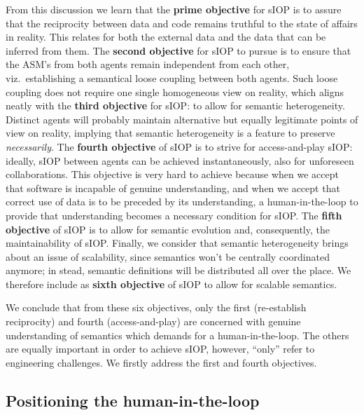 \documentclass[sort&compress,preprint,authoryear,3p,twocolumn]{elsarticle}
\begin{document}
From this discussion we learn that the \textbf{prime objective} for sIOP
is to assure that the reciprocity between data and code remains truthful
to the state of affairs in reality. This relates for both the external
data and the data that can be inferred from them. The \textbf{second
objective} for sIOP to pursue is to ensure that the ASM's from both
agents remain independent from each other, viz.~establishing a
semantical loose coupling between both agents. Such loose coupling does
not require one single homogeneous view on reality, which aligns neatly
with the \textbf{third objective} for sIOP: to allow for semantic
heterogeneity. Distinct agents will probably maintain alternative but
equally legitimate points of view on reality, implying that semantic
heterogeneity is a feature to preserve \emph{necessarily}. The
\textbf{fourth objective} of sIOP is to strive for access-and-play sIOP:
ideally, sIOP between agents can be achieved instantaneously, also for
unforeseen collaborations. This objective is very hard to achieve
because when we accept that software is incapable of genuine
understanding, and when we accept that correct use of data is to be
preceded by its understanding, a human-in-the-loop to provide that
understanding becomes a necessary condition for sIOP. The \textbf{fifth
objective} of sIOP is to allow for semantic evolution and, consequently,
the maintainability of sIOP. Finally, we consider that semantic
heterogeneity brings about an issue of scalability, since semantics
won't be centrally coordinated anymore; in stead, semantic definitions
will be distributed all over the place. We therefore include as
\textbf{sixth objective} of sIOP to allow for scalable semantics.

We conclude that from these six objectives, only the first (re-establish
reciprocity) and fourth (access-and-play) are concerned with genuine
understanding of semantics which demands for a human-in-the-loop. The
others are equally important in order to achieve sIOP, however, ``only''
refer to engineering challenges. We firstly address the first and fourth
objectives.

\hypertarget{positioning-the-human-in-the-loop}{%
\subsection{Positioning the
human-in-the-loop}\label{positioning-the-human-in-the-loop}}
\end{document}
